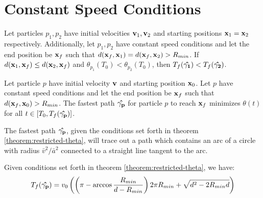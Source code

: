 \section{Constant Speed Conditions}

\begin{conjecture}
  Let particles $p_1, p_2$ have initial velocities $\mathbf{v}_1, \mathbf{v}_2$ and starting positions $\mathbf{x}_1 = \mathbf{x}_2$ respectively. Additionally, let $p_1, p_2$ have constant speed conditions and let the end position be $\mathbf{x}_f$ such that $d(\mathbf{x}_f, \mathbf{x}_1) = d(\mathbf{x}_f, \mathbf{x}_2) > R_{min}$. If $d(\mathbf{x}_1, \mathbf{x}_f) \leq d(\mathbf{x}_2, \mathbf{x}_f)$ and $\theta_{p_1}(T_0) < \theta_{p_2}(T_0)$, then $T_f(\mathbf{\hat{\gamma_1}}) < T_f(\mathbf{\hat{\gamma_2}})$.
\end{conjecture}

\begin{theorem}
  Let particle $p$ have initial velocity $\mathbf{v}$ and starting position $\mathbf{x}_0$. Let $p$ have constant speed conditions and let the end position be $\mathbf{x}_f$ such that $d(\mathbf{x}_f, \mathbf{x}_0) > R_{min}$. The fastest path $\mathbf{\hat{\gamma_p}}$ for particle $p$ to reach $\mathbf{x}_f$ minimizes $\theta(t)$ for all $t \in [T_0, T_f(\mathbf{\hat{\gamma_p}})]$.
  \label{theorem:restricted-theta}
\end{theorem}

\begin{corollary}
  The fastest path $\mathbf{\hat{\gamma_p}}$, given the conditions set forth in theorem \ref{theorem:restricted-theta}, will trace out a path which contains an arc of a circle with radius $\bar{v}^2 / \bar{a}^2$ connected to a straight line tangent to the arc.
\end{corollary}

\begin{corollary}
  Given conditions set forth in theorem \ref{theorem:restricted-theta}, we have:
  \begin{eqnarray}
    T_f(\mathbf{\hat{\gamma_p}}) = v_0 \left( \left( \pi - \arccos \frac{R_{min}}{d - R_{min}} \right) 2 \pi R_{min}  + \sqrt{d^2 - 2 R_{min} d}  \right)
  \end{eqnarray}
\end{corollary}
